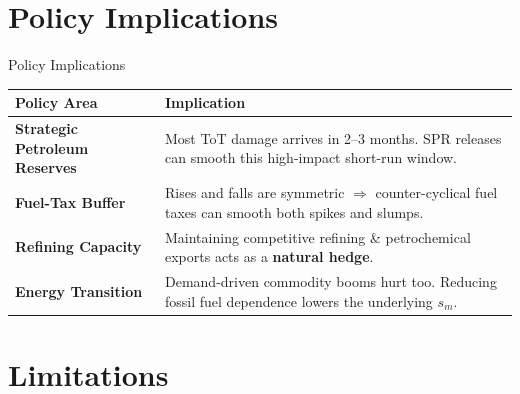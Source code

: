 \documentclass[10pt,aspectratio=169]{beamer}
\begin{document}
\section{Policy Implications}

\begin{frame}{Policy Implications}
  \begin{table}[ht]
    \centering\small
    \begin{tabular}{>{\bfseries}p{3.5cm} p{10cm}}
      \toprule
      \textbf{Policy Area} & \textbf{Implication} \\
      \midrule
      Strategic Petroleum Reserves & Most ToT damage arrives in 2--3 months. SPR releases can smooth this high-impact short-run window. \\[4pt]
      Fuel-Tax Buffer & Rises and falls are symmetric $\Rightarrow$ counter-cyclical fuel taxes can smooth both spikes and slumps. \\[4pt]
      Refining Capacity & Maintaining competitive refining \& petrochemical exports acts as a \textbf{natural hedge}. \\[4pt]
      Energy Transition & Demand-driven commodity booms hurt too. Reducing fossil fuel dependence lowers the underlying $s_m$. \\
      \bottomrule
    \end{tabular}
  \end{table}
\end{frame}

\section{Limitations}
\end{document}

